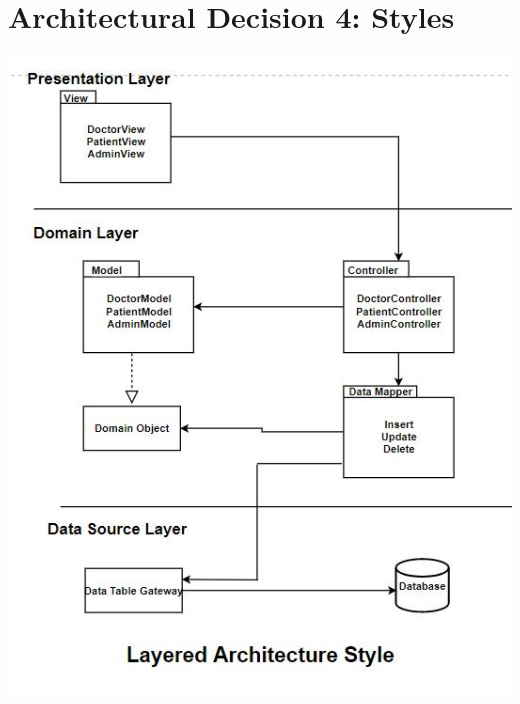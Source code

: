\documentclass[a4paper,12pt]{report}
\begin{document}
\section*{Architectural Decision 4: Styles}
\begin{center}
    \includegraphics{UML/LayeredArchitectureStyle.JPG}
\end{center}
\end{document}
